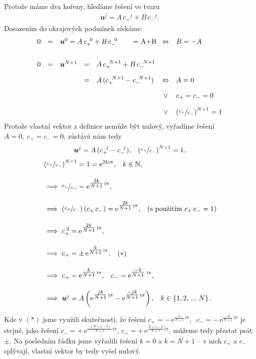 \documentclass[10pt,a4paper]{article}
\newcommand{\const}[1]{\text{#1}}
\newcommand{\e}[1]{\const{e}^{#1}}
\renewcommand{\i}{\const{i}}
\begin{document}
Protože máme dva kořeny, hledáme řešení ve tvaru
\begin{align*}
    \bm{u}^j = A \, {c_{+}}^j + B \, {c_{-}}^j.
\end{align*}
Dosazením do okrajových podmínek získáme:
\begin{equation*}
\begin{array}{rclclcl}
    0 &=& \multicolumn{3}{l}{\bm{u}^0 = A \, c_{+}^{\;\;0} + B \, c_{-}^{\;\;0}} = A+B &\Leftrightarrow& B = -A
    \\[20pt]
    0 &=& \bm{u}^{N+1} &=& A \, c_{+}^{\;\;N+1} + B \, c_{-}^{\;\;N+1}
    \\[10pt]
    & & &=& A \, (c_{+}^{\;\;N+1} - c_{-}^{\;\;N+1})
    &\Leftrightarrow& A = 0 \\[10pt]
    & & & & &\vee& c_{+} = c_{-} = 0 \\[10pt]
    & & & & &\vee& \left(\nicefrac{c_{+}}{c_{-}}\right)^{N+1} = 1
\end{array}
\end{equation*}
Protože vlastní vektor z definice nemůže být nulový, vyřadíme řešení $A=0, \; c_{+} = c_{-} = 0$, zůstává nám tedy
\begin{align*}
    \bm{u}^j = A \, (c_{+}^{\;\;j} - c_{-}^{\;\;j}), \;\;\;
    \left(\nicefrac{c_{+}}{c_{-}}\right)^{N+1} = 1. \\
\end{align*}
\begin{align*}
    &\left(\nicefrac{c_{+}}{c_{-}}\right)^{N+1} = 1 = \e{2k\i\pi}, \;\;\; k\in\mathbb{N},
    \\[10pt]
    &\implies \nicefrac{c_{+}}{c_{-}} = \e{\tfrac{2k}{N+1}\,\i\pi},
    \\[10pt]
    &\implies \left( \nicefrac{c_{+}}{c_{-}} \right) \left( c_{+}\,c_{-} \right) =  \e{\tfrac{2k}{N+1}\, \i\pi},
    \;\;\; \text{(s použitím }c_{+}\,c_{-}=1\text{)}
    \\[10pt]
    &\implies c_{+}^{\;2} = \e{\tfrac{2k}{N+1}\, \i\pi},
    \\[10pt]
    &\implies c_{+} = \pm \, \e{\tfrac{k}{N+1}\, \i\pi},
    \;\;\; (*)
    \\[10pt]
    &\implies c_{+} = \e{\tfrac{k}{N+1}\, \i\pi},
    \;\;\; c_{-} = \e{\tfrac{-k}{N+1}\; \i\pi},
    \\[10pt]
    &\implies \bm{u}^j = A \left( \e{\tfrac{jk}{N+1}\, \i\pi} - \e{\tfrac{-jk}{N+1}\, \i\pi} \right),
    \;\;\; k \in \left\{ 1, 2, \, ... \; N \right\}.
\end{align*}
\begin{spacing}{1.9}
\noindent
Kde v $(*)$ jsme využili skutečnosti, že řešení ${c_{+} = - \, \e{\tfrac{k}{N+1}\, \i\pi},} \;\; {c_{-} =  - \, \e{\tfrac{-k}{N+1}\, \i\pi}}$ je stejné, jako řešení ${c_{-} = + \, \e{\tfrac{-(N+1-k)}{N+1} \, \i\pi}}$, ${c_{+} = +\, \e{\tfrac{N+1-k}{N+1} \, \i\pi}}$, můžeme tedy přestat psát $\pm$. Na posledním řádku jsme vyřadili řešení $k=0$ a $k=N+1$ – v nich $c_{+}$ a $c_{-}$ splývají, vlastní vektor by tedy vyšel nulový.
\end{spacing}
\end{document}
